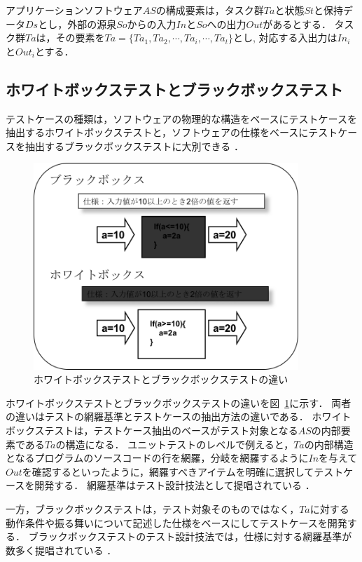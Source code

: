 アプリケーションソフトウェア$AS$の構成要素は，タスク群$Ta$と状態$St$と保持データ$Ds$とし，外部の源泉$So$からの入力$In$と$So$への出力$Out$があるとする．
タスク群$Ta$は，その要素を$Ta=\{Ta_1,Ta_2,\cdots,Ta_i,\cdots,Ta_t \}$とし, 対応する入出力は$In_i$と$Out_i$とする．
\subsection{ホワイトボックステストとブラックボックステスト}
テストケースの種類は，ソフトウェアの物理的な構造をベースにテストケースを抽出するホワイトボックステストと，ソフトウェアの仕様をベースにテストケースを抽出するブラックボックステストに大別できる\cite{myers2011art} ．

\begin{figure}[htbp]
  \begin{center}
  \includegraphics[width=10cm]{./image/D-2-BbWb.png}
  \caption{ホワイトボックステストとブラックボックステストの違い}
  \label{fig:D-2-BbWb}
  \end{center}
\end{figure}

ホワイトボックステストとブラックボックステストの違いを図~\ref{fig:D-2-BbWb}に示す．
両者の違いはテストの網羅基準とテストケースの抽出方法の違いである．
ホワイトボックステストは，テストケース抽出のベースがテスト対象となる$AS$の内部要素である$Ta$の構造になる．
ユニットテストのレベルで例えると，$Ta$の内部構造となるプログラムのソースコードの行を網羅，分岐を網羅するように$In$を与えて$Out$を確認するといったように，網羅すべきアイテムを明確に選択してテストケースを開発する．
網羅基準はテスト設計技法として提唱されている\cite{beiz90}
\cite{tj2005}
\cite{lewis2016software}
\cite{ammann2016introduction}
\cite{copeland2004practitioner}．

一方，ブラックボックステストは，テスト対象そのものではなく，$Ta$に対する動作条件や振る舞いについて記述した仕様をベースにしてテストケースを開発する．
ブラックボックステストのテスト設計技法では，仕様に対する網羅基準が数多く提唱されている\cite{jorgensen2016software}
\cite{binder2000testing}
\cite{kaner1999testing}
\cite{black2007pragmatic}
\cite{Ostrand:1988:CMS:62959.62964}
\cite{Grindal:2007:IPM:1332044.1332085}．

